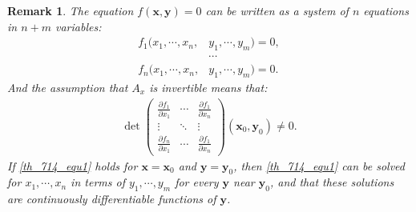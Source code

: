 \documentclass[11pt]{book}
\newtheorem{remark}{Remark}[chapter]
\theoremstyle{definition}
\numberwithin{equation}{chapter}
\begin{document}
\begin{remark}
The equation $f(\mathbf{x},\mathbf{y}) = 0$ can be written as a system of $n$ equations in $n + m$ variables:
\begin{align*}
    f_1(x_1, \cdots, x_n, & y_1, \cdots, y_m) = 0, \\
    & \cdots \\
    f_n(x_1, \cdots, x_n, & y_1, \cdots, y_m) = 0.
\end{align*}
And the assumption that $A_x$ is invertible means that:
\begin{align*}
    \det \begin{pmatrix}
        \frac{\partial f_1}{\partial x_1} & \cdots & \frac{\partial f_1}{\partial x_n} \\
        \vdots & \ddots & \vdots \\
        \frac{\partial f_n}{\partial x_1} & \cdots & \frac{\partial f_1}{\partial x_n}
    \end{pmatrix}(\mathbf{x}_0,\mathbf{y}_0) \neq 0.
\end{align*}
If \eqref{th_714_equ1} holds for $\mathbf{x} = \mathbf{x}_0$ and $\mathbf{y} = \mathbf{y}_0$, then \eqref{th_714_equ1} can be solved for $x_1, \cdots, x_n$ in terms of $y_1, \cdots, y_m$ for every $\mathbf{y}$ near $\mathbf{y}_0$, and that these solutions are continuously differentiable functions of $\mathbf{y}$.
\end{remark}
\end{document}
